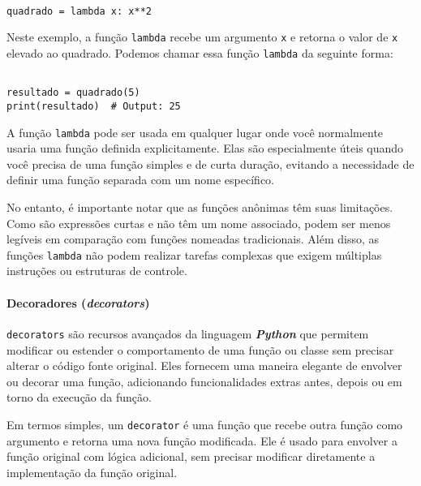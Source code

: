 \documentclass[a4paper, 12pt, onecolumn,singlespacing]{article}
\begin{document}
\begin{verbatim}

quadrado = lambda x: x**2

\end{verbatim}

Neste exemplo, a função \texttt{lambda} recebe um argumento \texttt{x} e retorna o valor de \texttt{x} elevado ao quadrado. Podemos chamar essa função \texttt{lambda} da seguinte forma:

\begin{verbatim}
	
resultado = quadrado(5)
print(resultado)  # Output: 25

\end{verbatim}

	A função \texttt{lambda} pode ser usada em qualquer lugar onde você normalmente usaria uma função definida explicitamente. Elas são especialmente úteis quando você precisa de uma função simples e de curta duração, evitando a necessidade de definir uma função separada com um nome específico.
	
	No entanto, é importante notar que as funções anônimas têm suas limitações. Como são expressões curtas e não têm um nome associado, podem ser menos legíveis em comparação com funções nomeadas tradicionais. Além disso, as funções \texttt{lambda} não podem realizar tarefas complexas que exigem múltiplas instruções ou estruturas de controle.

	\paragraph{Decoradores (\textit{decorators})} \label{python_decorators} \texttt{decorators} são recursos avançados da linguagem \textit{\textbf{Python}} que permitem modificar ou estender o comportamento de uma função ou classe sem precisar alterar o código fonte original. Eles fornecem uma maneira elegante de envolver ou decorar uma função, adicionando funcionalidades extras antes, depois ou em torno da execução da função.
	
	Em termos simples, um \texttt{decorator} é uma função que recebe outra função como argumento e retorna uma nova função modificada. Ele é usado para envolver a função original com lógica adicional, sem precisar modificar diretamente a implementação da função original.
	
\end{document}
